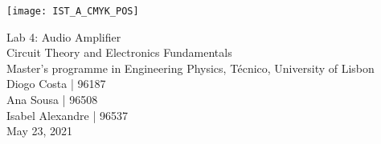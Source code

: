 
\thispagestyle {empty}

\texttt{[image: IST\_A\_CMYK\_POS]}

\begin{center}
%
\vspace{1.0cm}

\vspace{1cm}
{\FontLb \Huge Lab 4: Audio Amplifier} \\ %
\vspace{1cm}
{\FontSn \Large Circuit Theory and Electronics Fundamentals} \\ %
{\FontSn \large Master's programme in Engineering Physics, Técnico, University of Lisbon} \\ %
\vspace{1cm}
{\FontSn Diogo Costa | 96187} \\
{\FontSn Ana Sousa | 96508} \\
{\FontSn Isabel Alexandre | 96537} \\
\vspace{1cm}
{\FontSn May 23, 2021} \\ %
%
\end{center}


